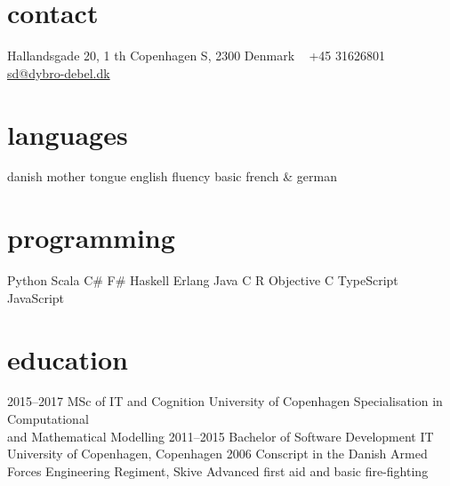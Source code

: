 \documentclass[]{friggeri-cv} %
\begin{document}


\begin{aside} %
\section{contact}
Hallandsgade 20, 1 th
Copenhagen S, 2300
Denmark
~
+45 31626801
~
\href{mailto:sd@dybro-debel.dk}{sd@dybro-debel.dk}
\section{languages}
danish mother tongue
english fluency
basic french \& german
\section{programming}
Python Scala C\# F\# Haskell Erlang Java C R 
Objective C
TypeScript JavaScript
\end{aside}


\section{education}

\begin{entrylist}
\entry
{2015--2017}
{MSc {\normalfont of IT and Cognition}}
{University of Copenhagen}
{Specialisation in Computational\\and Mathematical Modelling}
\entry
{2011--2015}
{Bachelor {\normalfont of Software Development}}
{IT University of Copenhagen, Copenhagen}
{}
\entry
{2006}
{Conscript {\normalfont in the Danish Armed Forces}}
{Engineering Regiment, Skive}
{Advanced first aid and basic fire-fighting}
\end{entrylist}
\end{document}
